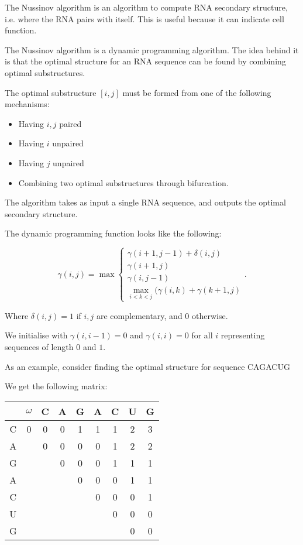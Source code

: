



The Nussinov algorithm is an algorithm to compute RNA secondary structure, i.e. where the RNA pairs with itself. This is useful because it can indicate cell function.

The Nussinov algorithm is a dynamic programming algorithm. The idea behind it is that the optimal structure for an RNA sequence can be found by combining optimal substructures.

The optimal substructure $[i,j]$ must be formed from one of the following mechanisms:


\begin{itemize}
    
  \item
Having $i,j$ paired
\item

Having $i$ unpaired
\item

Having $j$ unpaired
\item

Combining two optimal substructures through bifurcation.
\end{itemize}

The algorithm takes as input a single RNA sequence, and outputs the optimal secondary structure.

The dynamic programming function looks like the following:

\[
  \gamma(i,j) = \max \begin{cases}\gamma(i+1, j-1) + \delta(i,j)\\\gamma(i+1, j) \\\gamma(i, j-1)\\\max_{i < k < j} (\gamma(i,k) + \gamma(k+1, j)\end{cases}
.\]

Where $\delta(i,j) = 1$ if $i,j$ are complementary, and 0 otherwise.

We initialise with $\gamma(i, i-1) = 0$ and $\gamma(i,i) = 0$ for all $i$ representing sequences of length $0$ and $1$.


As an example, consider finding the optimal structure for sequence CAGACUG

We get the following matrix:

\begin{tabular}{c|c|c|c|c|c|c|c|c}
  &$\omega$&C&A&G&A&C&U&G\\
  \hline
  C&0&0&0&1&1&1&2&3\\
  \hline
  A&&0&0&0&0&1&2&2\\
  \hline
  G&&&0&0&0&1&1&1\\
  \hline
  A&&&&0&0&0&1&1\\
  \hline
  C&&&&&0&0&0&1\\
  \hline
  U&&&&&&0&0&0\\
  \hline
  G&&&&&&&0&0
\end{tabular}

